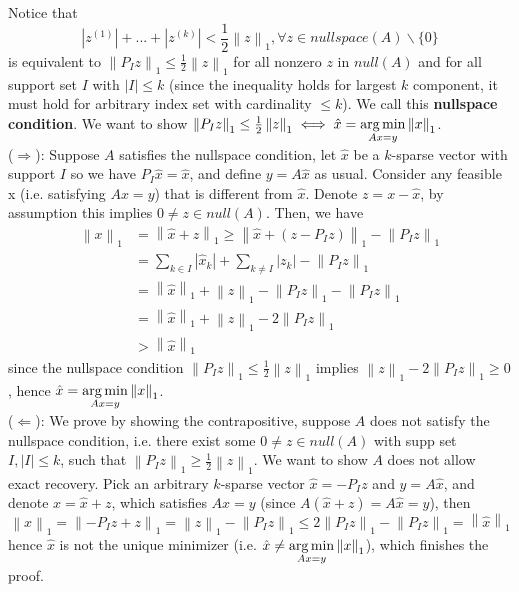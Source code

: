 \documentclass[10pt]{article}
\def\imp{\Rightarrow}
\def\limp{\Leftarrow}
\def\argmin{\mathop{\rm arg\,min}}
\theoremstyle{definition}
\newcommand{\half}[0]{\frac{1}{2}}
\newcommand{\norm}[1]{\left\lVert#1\right\rVert} %
\begin{document}
\proof Notice that $$|z^{(1)}| + ... + |z^{(k)}| < \half \norm{z}_{1}, \forall z \in nullspace(A)\backslash \{0\}$$
is equivalent to $\norm{P_Iz}_{1} \le \half\norm{z}_{1}$ for all nonzero $z$ in $null(A)$
and for all support set $I$ with $|I|\le k$
(since the inequality holds for largest $k$ component,
it must hold for arbitrary index set with cardinality $\le k$).
We call this \textbf{nullspace condition}.
We want to show $\norm{P_Iz}_{1} \le \half\norm{z}_{1}
	\iff \hat{x} = \argmin\limits_{Ax = y}\norm{x}_{1}$.\\
($\imp$): Suppose $A$ satisfies the nullspace condition,
let $\hat{x}$ be a $k$-sparse vector with support $I$ so we have $P_I\hat{x} = \hat{x}$,
and define $y = A\hat{x}$ as usual.
Consider any feasible x (i.e. satisfying $Ax = y$) that is different from $\hat{x}$.
Denote $z = x - \hat{x}$, by assumption this implies $0 \neq z \in null(A)$.
Then, we have
\begin{equation*}
	\begin{split}
		\norm{x}_{1} &= \norm{\hat{x} + z}_{1} \ge \norm{\hat{x} + (z - P_Iz)}_{1} - \norm{P_Iz}_{1}\\
		&= \sum_{k \in I}|\hat{x}_{k}| + \sum_{k \neq I}|z_k| - \norm{P_Iz}_{1}\\
		&= \norm{\hat{x}}_{1} + \norm{z}_{1} - \norm{P_Iz}_{1} - \norm{P_Iz}_{1}\\
		&= \norm{\hat{x}}_{1} + \norm{z}_{1} - 2\norm{P_Iz}_{1}\\
		&> \norm{\hat{x}}_{1}
	\end{split}
\end{equation*}
since the nullspace condition $\norm{P_Iz}_{1} \le \half\norm{z}_{1}$
implies $\norm{z}_{1} - 2\norm{P_Iz}_{1} \ge 0$,
hence $\hat{x} = \argmin\limits_{Ax = y}\norm{x}_{1}$.\\
($\limp$): We prove by showing the contrapositive,
suppose $A$ does not satisfy the nullspace condition,
i.e. there exist some $0 \neq z \in null(A)$ with supp set $I, |I| \le k$,
such that $\norm{P_Iz}_{1} \ge \half\norm{z}_{1}$. We want to show $A$ does not allow exact recovery.
Pick an arbitrary $k$-sparse vector $\hat{x} = - P_{I}z$ and $y = A\hat{x}$,
and denote $x = \hat{x} + z$, which satisfies $Ax = y$ (since $A(\hat{x} + z) = A\hat{x} = y$), then
\begin{equation*}
	\norm{x}_{1} = \norm{-P_Iz + z}_{1} = \norm{z}_{1} - \norm{P_Iz}_{1}
	\le 2\norm{P_Iz}_{1} - \norm{P_Iz}_{1} = \norm{\hat{x}}_{1}
\end{equation*}
hence $\hat{x}$ is not the unique minimizer
(i.e. $\hat{x} \neq \argmin\limits_{Ax = y}\norm{x}_{1}$),
which finishes the proof.
\qedhere
\end{document}
